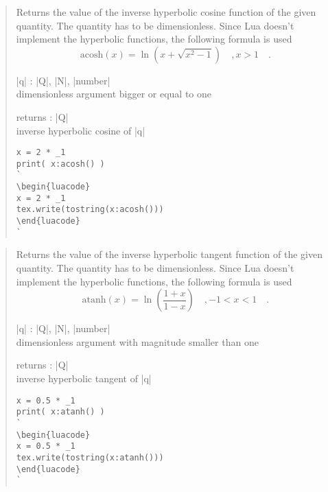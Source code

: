 \documentclass{ltxdoc}
\begin{document}
\begin{quote}
  Returns the value of the inverse hyperbolic cosine function of the given quantity. The quantity has to be dimensionless. Since Lua doesn't implement the hyperbolic functions, the following formula is used
  \begin{equation*}
    \text{acosh}(x) = \ln\left( x + \sqrt{x^2 - 1} \right)  \quad, x > 1 \quad.
  \end{equation*}

  \begin{description}
  \item |q| : |Q|, |N|, |number|\\
    dimensionless argument bigger or equal to one

  \item returns : |Q|\\
    inverse hyperbolic cosine of |q|
  \end{description}


\begin{lstlisting}
x = 2 * _1
print( x:acosh() )
`
\begin{luacode}
x = 2 * _1
tex.write(tostring(x:acosh()))
\end{luacode}
`
\end{lstlisting}

\end{quote}



\begin{quote}
  Returns the value of the inverse hyperbolic tangent function of the given quantity. The quantity has to be dimensionless. Since Lua doesn't implement the hyperbolic functions, the following formula is used
  \begin{equation*}
    \text{atanh}(x) = \ln\left( \frac{1 + x}{1 - x} \right)  \quad, -1 < x < 1 \quad.
  \end{equation*}

  \begin{description}
  \item |q| : |Q|, |N|, |number|\\
    dimensionless argument with magnitude smaller than one

  \item returns : |Q|\\
    inverse hyperbolic tangent of |q|
  \end{description}



\begin{lstlisting}
x = 0.5 * _1
print( x:atanh() )
`
\begin{luacode}
x = 0.5 * _1
tex.write(tostring(x:atanh()))
\end{luacode}
`
\end{lstlisting}

\end{quote}
\end{document}
